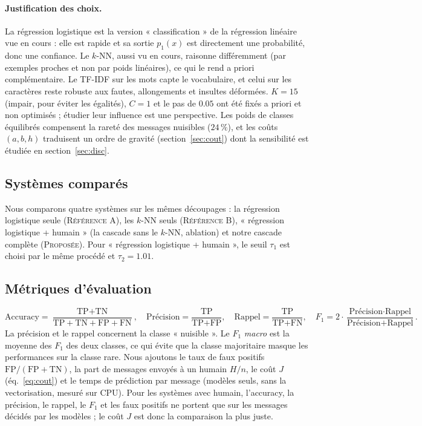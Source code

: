 \documentclass[a4paper,fleqn]{cas-sc}
\begin{document}
\paragraph{Justification des choix.}
La régression logistique est la version « classification » de la régression
linéaire vue en cours : elle est rapide et sa sortie $p_1(x)$ est directement
une probabilité, donc une confiance. Le $k$-NN, aussi vu en cours, raisonne
différemment (par exemples proches et non par poids linéaires), ce qui le rend
a priori complémentaire. Le TF-IDF sur les mots capte le vocabulaire, et celui
sur les caractères reste robuste aux fautes, allongements et insultes
déformées. $K=15$ (impair, pour éviter les égalités), $C=1$ et le pas de $0.05$
ont été fixés a priori et non optimisés ; étudier leur influence est une
perspective. Les poids de classes équilibrés compensent la rareté des messages
nuisibles ($24\,\%$), et les coûts $(a,b,h)$ traduisent un ordre de gravité
(section~\ref{sec:cout}) dont la sensibilité est étudiée en section~\ref{sec:disc}.

\subsection{Systèmes comparés}

Nous comparons quatre systèmes sur les mêmes découpages : la régression logistique seule (\textsc{Référence A}),
les $k$-NN seuls (\textsc{Référence B}), « régression logistique + humain » (la cascade sans le $k$-NN,
ablation) et notre cascade complète (\textsc{Proposée}). Pour « régression logistique + humain », le seuil
$\tau_1$ est choisi par le même procédé et $\tau_2=1.01$.

\subsection{Métriques d'évaluation}

\begin{equation}
\text{Accuracy} = \frac{\text{TP}+\text{TN}}{\text{TP}+\text{TN}+\text{FP}+\text{FN}}, \quad
\text{Précision} = \frac{\text{TP}}{\text{TP}+\text{FP}}, \quad
\text{Rappel} = \frac{\text{TP}}{\text{TP}+\text{FN}}, \quad
F_1 = 2 \cdot \frac{\text{Précision} \cdot \text{Rappel}}{\text{Précision} + \text{Rappel}}.
\end{equation}
La précision et le rappel concernent la classe « nuisible ». Le $F_1$ \textit{macro} est la moyenne des
$F_1$ des deux classes, ce qui évite que la classe majoritaire masque les performances sur la classe
rare. Nous ajoutons le taux de faux positifs $\mathrm{FP}/(\mathrm{FP}+\mathrm{TN})$, la part de messages
envoyés à un humain $H/n$, le coût $J$ (éq.~\ref{eq:cout}) et le temps de prédiction par message (modèles
seuls, sans la vectorisation, mesuré sur CPU). Pour les systèmes avec humain, l'accuracy, la précision, le
rappel, le $F_1$ et les faux positifs ne portent que sur les messages décidés par les modèles ; le coût
$J$ est donc la comparaison la plus juste.
\end{document}
